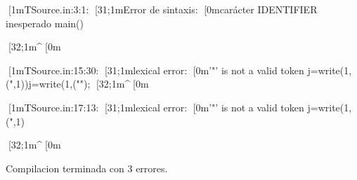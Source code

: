 [1mTSource.in:3:1: [31;1mError de sintaxis: [0mcarácter IDENTIFIER inesperado 
main(){
[32;1m^[0m

[1mTSource.in:15:30: [31;1mlexical error: [0m'"' is not a valid token
 j=write(1,(",1))j=write(1,("");
                              [32;1m^[0m

[1mTSource.in:17:13: [31;1mlexical error: [0m'"' is not a valid token
 j=write(1,(",1)}
             [32;1m^[0m



Compilacion terminada con 3 errores.
